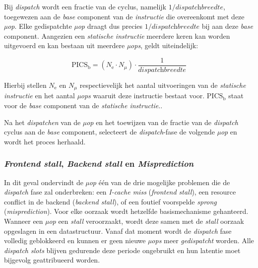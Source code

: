 \documentclass[12pt,a4paper,faculty=ea,language=nl]{ugent-doc}
\begin{document}
Bij \textit{dispatch} wordt een fractie van de cyclus, namelijk \(1 / \textit{dispatchbreedte}\), toegewezen aan de \textit{base} component van de \textit{instructie} die overeenkomt met deze \textit{µop}. Elke gedispatchte \textit{µop} draagt dus precies $1 / \textit{dispatchbreedte}$ bij aan deze \textit{base} component.
Aangezien een \textit{statische instructie} meerdere keren kan worden uitgevoerd en kan bestaan uit meerdere \textit{µops}, geldt uiteindelijk:

\begin{equation}
    \text{PICS}_{\text{b}} = (N_{\text{e}} \cdot N_{\mu}) \cdot \frac{1}{\textit{dispatchbreedte}}
    \label{eq:pics_base}
\end{equation}

Hierbij stellen $N_{\text{e}}$ en $N_{\mu}$ respectievelijk het aantal uitvoeringen
van de \textit{statische instructie} en het aantal \textit{µops} waaruit deze instructie
bestaat voor. $\text{PICS}_{\text{b}}$ staat voor de \textit{base} component van de
\textit{statische instructie}..



Na het \textit{dispatchen} van de \textit{µop} en het toewijzen van de fractie van de \textit{dispatch} cyclus aan de \textit{base} component, selecteert de \textit{dispatch}-fase de volgende \textit{µop} en wordt het proces herhaald.

\subsubsection{\textit{Frontend stall}, \textit{Backend stall} en \textit{Misprediction}}
\label{paragraph:basismechanisme PICS}
In dit geval ondervindt de \textit{µop} één van de drie mogelijke problemen die de \textit{dispatch} fase zal onderbreken: een \textit{I-cache miss} (\textit{frontend stall}), een resource conflict in de backend (\textit{backend stall}), of een foutief voorspelde \textit{sprong} (\textit{misprediction}).
Voor elke oorzaak wordt hetzelfde basismechanisme gehanteerd. Wanneer een \textit{µop} een \textit{stall} veroorzaakt, wordt deze samen met de \textit{stall} oorzaak opgeslagen in een datastructuur. Vanaf dat moment wordt de \textit{dispatch} fase volledig geblokkeerd en kunnen er geen nieuwe \textit{µops} meer \textit{gedispatcht} worden.
Alle \textit{dispatch slots} blijven gedurende deze periode ongebruikt en hun latentie moet bijgevolg geattribueerd worden.
\end{document}
